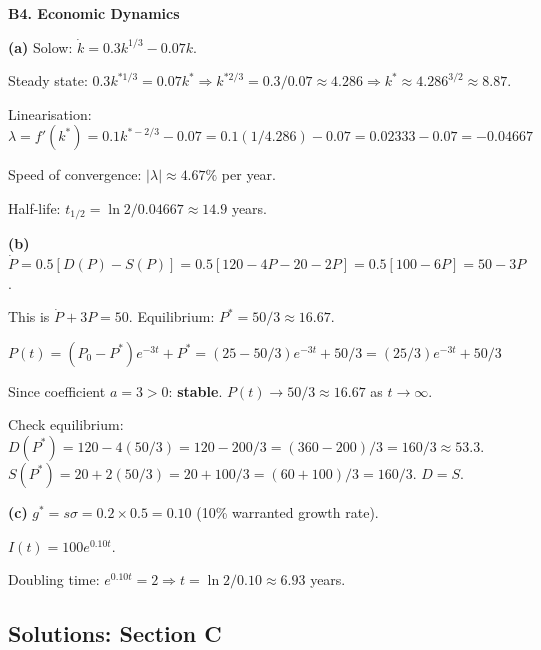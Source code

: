 \documentclass[12pt, a4paper]{article}
\theoremstyle{definition}
\begin{document}
\begin{solbox}
\textbf{B4. Economic Dynamics}

\textbf{(a)} Solow: $\dot k=0.3k^{1/3}-0.07k$.

Steady state: $0.3k^{*1/3}=0.07k^* \Rightarrow k^{*2/3}=0.3/0.07 \approx 4.286
\Rightarrow k^*\approx 4.286^{3/2}\approx 8.87$.

Linearisation: $\lambda = f'(k^*) = 0.1k^{*-2/3}-0.07
= 0.1(1/4.286)-0.07 = 0.02333-0.07 = -0.04667$

Speed of convergence: $|\lambda|\approx 4.67\%$ per year.

Half-life: $t_{1/2}=\ln 2/0.04667\approx 14.9$ years.

\textbf{(b)} $\dot P=0.5[D(P)-S(P)]=0.5[120-4P-20-2P]=0.5[100-6P]=50-3P$.

This is $\dot P+3P=50$. Equilibrium: $P^*=50/3\approx 16.67$.

$P(t)=(P_0-P^*)e^{-3t}+P^*=(25-50/3)e^{-3t}+50/3=(25/3)e^{-3t}+50/3$

Since coefficient $a=3>0$: \textbf{stable}. $P(t)\to 50/3\approx 16.67$ as $t\to\infty$.

Check equilibrium: $D(P^*)=120-4(50/3)=120-200/3=(360-200)/3=160/3\approx 53.3$.
$S(P^*)=20+2(50/3)=20+100/3=(60+100)/3=160/3$. $D=S$. \checkmark

\textbf{(c)} $g^*=s\sigma=0.2\times 0.5=0.10$ (10\% warranted growth rate).

$I(t)=100e^{0.10t}$.

Doubling time: $e^{0.10t}=2 \Rightarrow t=\ln 2/0.10\approx 6.93$ years.
\end{solbox}

\subsection{Solutions: Section C}
\end{document}
